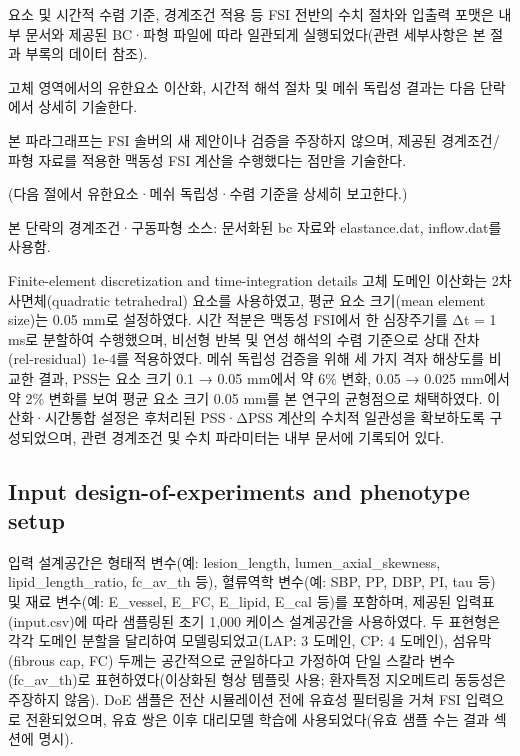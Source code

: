 \documentclass[preprint,12pt]{elsarticle}
\begin{document}
요소 및 시간적 수렴 기준, 경계조건 적용 등 FSI 전반의 수치 절차와 입출력 포맷은 내부 문서와 제공된 BC·파형 파일에 따라 일관되게 실행되었다(관련 세부사항은 본 절과 부록의 데이터 참조).

고체 영역에서의 유한요소 이산화, 시간적 해석 절차 및 메쉬 독립성 결과는 다음 단락에서 상세히 기술한다.

본 파라그래프는 FSI 솔버의 새 제안이나 검증을 주장하지 않으며, 제공된 경계조건/파형 자료를 적용한 맥동성 FSI 계산을 수행했다는 점만을 기술한다.

(다음 절에서 유한요소·메쉬 독립성·수렴 기준을 상세히 보고한다.)

본 단락의 경계조건·구동파형 소스: 문서화된 bc 자료와 elastance.dat, inflow.dat를 사용함.

Finite-element discretization and time-integration details
고체 도메인 이산화는 2차 사면체(quadratic tetrahedral) 요소를 사용하였고, 평균 요소 크기(mean element size)는 0.05 mm로 설정하였다. 시간 적분은 맥동성 FSI에서 한 심장주기를 Δt = 1 ms로 분할하여 수행했으며, 비선형 반복 및 연성 해석의 수렴 기준으로 상대 잔차(rel‑residual) 1e-4를 적용하였다. 메쉬 독립성 검증을 위해 세 가지 격자 해상도를 비교한 결과, PSS는 요소 크기 0.1 → 0.05 mm에서 약 6\% 변화, 0.05 → 0.025 mm에서 약 2\% 변화를 보여 평균 요소 크기 0.05 mm를 본 연구의 균형점으로 채택하였다. 이산화·시간통합 설정은 후처리된 PSS·ΔPSS 계산의 수치적 일관성을 확보하도록 구성되었으며, 관련 경계조건 및 수치 파라미터는 내부 문서에 기록되어 있다.

\subsection{Input design-of-experiments and phenotype setup}
입력 설계공간은 형태적 변수(예: lesion\_length, lumen\_axial\_skewness, lipid\_length\_ratio, fc\_av\_th 등), 혈류역학 변수(예: SBP, PP, DBP, PI, tau 등) 및 재료 변수(예: E\_vessel, E\_FC, E\_lipid, E\_cal 등)를 포함하며, 제공된 입력표(input.csv)에 따라 샘플링된 초기 1,000 케이스 설계공간을 사용하였다. 두 표현형은 각각 도메인 분할을 달리하여 모델링되었고(LAP: 3 도메인, CP: 4 도메인), 섬유막(fibrous cap, FC) 두께는 공간적으로 균일하다고 가정하여 단일 스칼라 변수(fc\_av\_th)로 표현하였다(이상화된 형상 템플릿 사용; 환자특정 지오메트리 동등성은 주장하지 않음). DoE 샘플은 전산 시뮬레이션 전에 유효성 필터링을 거쳐 FSI 입력으로 전환되었으며, 유효 쌍은 이후 대리모델 학습에 사용되었다(유효 샘플 수는 결과 섹션에 명시).
\end{document}
